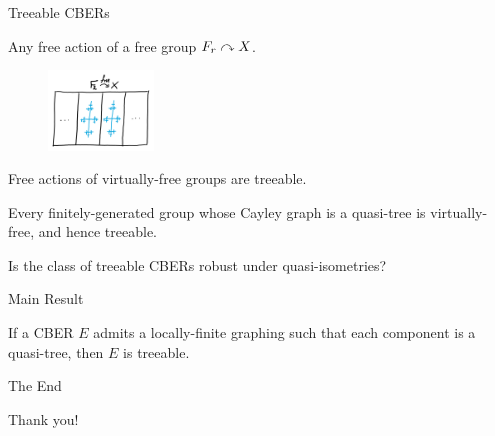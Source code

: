 \documentclass{beamer}
\begin{document}
    \begin{frame}{Treeable CBERs}
        \vspace{-0.2in}

        \begin{example}
            Any free action of a free group $F_r\curvearrowright X$.
        \end{example}

        \begin{figure}[h!]
            \vspace{-0.8in}
            \hfill
            \includegraphics[width=0.25\textwidth]{img/free_group_action.png}
        \end{figure}

        \pause
        \vspace{-0.28in}

        \begin{theorem}[JKL02]
            Free actions of virtually-free groups are treeable.
        \end{theorem}

        \pause

        \begin{theorem}[GdlH90]
            Every finitely-generated group whose Cayley graph is a quasi-tree is virtually-free, and hence treeable.
        \end{theorem}

        \begin{question}
            Is the class of treeable CBERs robust under quasi-isometries?
        \end{question}
    \end{frame}
    \begin{frame}{Main Result}
        \begin{theorem}
            If a CBER $E$ admits a locally-finite graphing such that each component is a quasi-tree, then $E$ is treeable.
        \end{theorem}
    \end{frame}
    \begin{frame}{The End}
        \begin{center}
            Thank you!
        \end{center}
    \end{frame}
\end{document}

